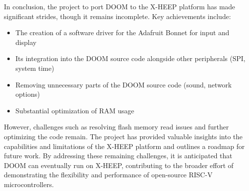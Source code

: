 In conclusion, the project to port DOOM to the X-HEEP platform has made significant strides, though it remains incomplete. Key achievements include: \\

\begin{itemize}
    \item The creation of a software driver for the Adafruit Bonnet for input and display
    \item Its integration into the DOOM source code alongside other peripherals (SPI, system time)
    \item Removing unnecessary parts of the DOOM source code (sound, network options)
    \item Substantial optimization of RAM usage
\end{itemize}    

However, challenges such as resolving flash memory read issues and further optimizing the code remain.
The project has provided valuable insights into the capabilities and limitations of the X-HEEP platform and outlines a roadmap for future work. By addressing these remaining challenges, it is anticipated that DOOM can eventually run on X-HEEP, contributing to the broader effort of demonstrating the flexibility and performance of open-source RISC-V microcontrollers.